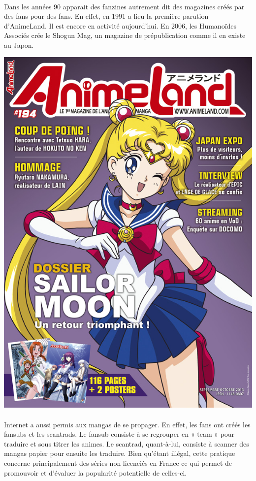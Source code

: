 \paragraph{}
Dans les années 90 apparait des fanzines autrement dit des magazines créés par des fans pour des fans. En effet, en 1991 a lieu la première parution d’AnimeLand. Il est encore en activité aujourd’hui. En 2006, les Humanoïdes Associés crée le Shogun Mag, un magazine de prépublication comme il en existe au Japon. 
\begin{center}
\includegraphics[scale=0.8]{animeland.jpg}
\end{center}
\paragraph{}
Internet a aussi permis aux mangas de se propager. En effet, les fans ont créés les fansubs et les scantrads. Le fansub consiste à se regrouper en « team » pour traduire et sous titrer les animes. Le scantrad, quant-à-lui, consiste à scanner des mangas papier pour ensuite les traduire. Bien qu’étant illégal, cette pratique concerne principalement des séries non licenciés en France ce qui permet de promouvoir et d’évaluer la popularité potentielle de celles-ci.

